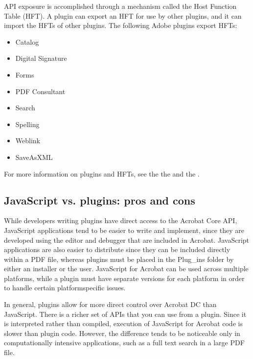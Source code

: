 \documentclass[letterpaper,12pt,english,openany,oneside]{sphinxmanual}
\begin{document}
API exposure is accomplished through a mechanism called the Host Function Table (HFT). A plug\sphinxhyphen{}in can export an HFT for use by other plug\sphinxhyphen{}ins, and it can import the HFTs of other plug\sphinxhyphen{}ins. The following Adobe plug\sphinxhyphen{}ins export HFTs:
\begin{itemize}
\item {} 
Catalog

\item {} 
Digital Signature

\item {} 
Forms

\item {} 
PDF Consultant

\item {} 
Search

\item {} 
Spelling

\item {} 
Weblink

\item {} 
SaveAsXML

\end{itemize}

For more information on plug\sphinxhyphen{}ins and HFTs, see the the  and the  .


\subsection{JavaScript vs. plugins: pros and cons}
\label{\detokenize{index:javascript-vs-plugins-pros-and-cons}}
While developers writing plug\sphinxhyphen{}ins have direct access to the Acrobat Core API, JavaScript applications tend to be easier to write and implement, since they are developed using the editor and debugger that are included in Acrobat. JavaScript applications are also easier to distribute since they can be included directly within a PDF file, whereas plug\sphinxhyphen{}ins must be placed in the Plug\_ins folder by either an installer or the user. JavaScript for Acrobat can be used across multiple platforms, while a plug\sphinxhyphen{}in must have separate versions for each platform in order to handle certain platform\sphinxhyphen{}specific issues.

In general, plug\sphinxhyphen{}ins allow for more direct control over Acrobat DC than JavaScript. There is a richer set of APIs that you can use from a plug\sphinxhyphen{}in. Since it is interpreted rather than compiled, execution of JavaScript for Acrobat code is slower than plug\sphinxhyphen{}in code. However, the difference tends to be noticeable only in computationally intensive applications, such as a full text search in a large PDF file.
\end{document}
